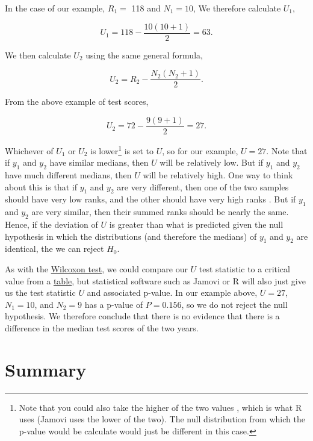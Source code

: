 \documentclass[
]{scrbook}
\begin{document}
In the case of our example, \(R_{1}=\) 118 and \(N_{1} = 10\),
We therefore calculate \(U_{1}\),

\[U_{1} = 118 - \frac{10\left(10 + 1 \right)}{2} = 63.\]

We then calculate \(U_{2}\) using the same general formula,

\[U_{2} = R_{2} - \frac{N_{2}\left(N_{2} + 1 \right)}{2}.\]

From the above example of test scores,

\[U_{2} = 72 - \frac{9\left(9 + 1 \right)}{2} = 27.\]

Whichever of \(U_{1}\) or \(U_{2}\) is lower\footnote{Note that you could also take the higher of the two values \citep{Sokal1995}, which is what R uses (Jamovi uses the lower of the two). The null distribution from which the p-value would be calculate would just be different in this case.} is set to \(U\), so for our example, \(U = 27\).
Note that if \(y_{1}\) and \(y_{2}\) have similar medians, then \(U\) will be relatively low.
But if \(y_{1}\) and \(y_{2}\) have much different medians, then \(U\) will be relatively high.
One way to think about this is that if \(y_{1}\) and \(y_{2}\) are very different, then one of the two samples should have very low ranks, and the other should have very high ranks \citep{Sokal1995}.
But if \(y_{1}\) and \(y_{2}\) are very similar, then their summed ranks should be nearly the same.
Hence, if the deviation of \(U\) is greater than what is predicted given the null hypothesis in which the distributions (and therefore the medians) of \(y_{1}\) and \(y_{2}\) are identical, the we can reject \(H_{0}\).

As with the \protect\hyperlink{wilcoxon-test}{Wilcoxon test}, we could compare our \(U\) test statistic to a critical value from a \protect\hyperlink{mann-whitney-u-critical-values}{table}, but statistical software such as Jamovi or R will also just give us the test statistic \(U\) and associated p-value.
In our example above, \(U = 27\), \(N_{1} = 10\), and \(N_{2} = 9\) has a p-value of \(P = 0.156\), so we do not reject the null hypothesis.
We therefore conclude that there is no evidence that there is a difference in the median test scores of the two years.

\hypertarget{summary-3}{%
\section{Summary}\label{summary-3}}
\end{document}
